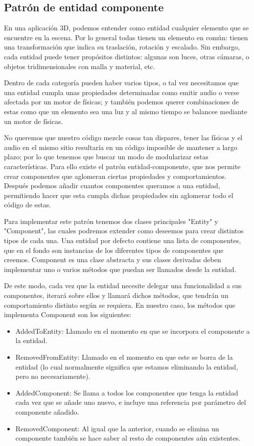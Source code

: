 \subsection{Patrón de entidad componente}
\label{entity_component}
En una aplicación 3D, podemos entender como entidad cualquier elemento que se encuentre en la escena. Por lo general todas tienen un elemento en común: tienen una transformación que indica su traslación, rotación y escalado. Sin embargo, cada entidad puede tener propósitos distintos: algunas son luces, otras cámaras, o objetos tridimensionales con malla y material, etc.

Dentro de cada categoría pueden haber varios tipos, o tal vez necesitamos que una entidad cumpla unas propiedades determinadas como emitir audio o verse afectada por un motor de físicas; y también podemos querer combinaciones de estas como que un elemento sea una luz y al mismo tiempo se balancee mediante un motor de físicas.

No queremos que nuestro código mezcle cosas tan dispares, tener las físicas y el audio en el mismo sitio resultaría en un código imposible de mantener a largo plazo; por lo que tenemos que buscar un modo de modularizar estas características. Para ello existe el patrón entidad-componente\cite{game_programming_patterns}, que nos permite crear componentes que aglomeran ciertas propiedades y comportamientos. Después podemos añadir cuantos componentes queramos a una entidad, permitiendo hacer que esta cumpla dichas propiedades sin aglomerar todo el código de estas.

Para implementar este patrón tenemos dos clases principales "Entity" y "Component", las cuales podremos extender como deseemos para crear distintos tipos de cada una. Una entidad por defecto contiene una lista de componentes, que en el fondo son instancias de los diferentes tipos de componentes que creemos. Component es una clase abstracta y sus clases derivadas deben implementar uno o varios métodos que puedan ser llamados desde la entidad.

De este modo, cada vez que la entidad necesite delegar una funcionalidad a sus componentes, iterará sobre ellos y llamará dichos métodos, que tendrán un comportamiento distinto según se requiera. En nuestro caso, los métodos que implementa Component son los siguientes:

\begin{itemize}
    \item AddedToEntity: Llamado en el momento en que se incorpora el componente a la entidad.
    \item RemovedFromEntity: Llamado en el momento en que este se borra de la entidad (lo cual normalmente significa que estamos eliminando la entidad, pero no necesariamente).
    \item AddedComponent: Se llama a todos los componentes que tenga la entidad cada vez que se añade uno nuevo, e incluye una referencia por parámetro del componente añadido.
    \item RemovedComponent: Al igual que la anterior, cuando se elimina un componente también se hace saber al resto de componentes aún existentes.
\end{itemize}


